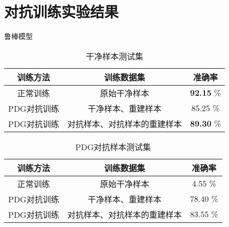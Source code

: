 \section{对抗训练实验结果}

\begin{frame}{鲁棒模型}
    \begin{table}[]
        \begin{center}
            \caption{干净样本测试集}
            \begin{tabular}{cc|c}
                \textbf{训练方法} & \textbf{训练数据集} & \textbf{准确率} \\
                \hline
                正常训练    & 原始干净样本               & \textbf{92.15} \% \\
                PDG对抗训练 & 干净样本、重建样本          & 85.25 \% \\
                PDG对抗训练 & 对抗样本、对抗样本的重建样本 & \textbf{89.30} \% \\
            \end{tabular}
        \end{center}
    \end{table}
    
    \begin{table}[]
        \begin{center}
            \caption{PDG对抗样本测试集}
            \begin{tabular}{cc|c}
                \textbf{训练方法} & \textbf{训练数据集} & \textbf{准确率} \\
                \hline
                正常训练    & 原始干净样本               & 4.55 \% \\
                PDG对抗训练 & 干净样本、重建样本          & 78.40 \% \\
                PDG对抗训练 & 对抗样本、对抗样本的重建样本 & 83.55 \% \\
            \end{tabular}
        \end{center}
    \end{table}    
\end{frame}


